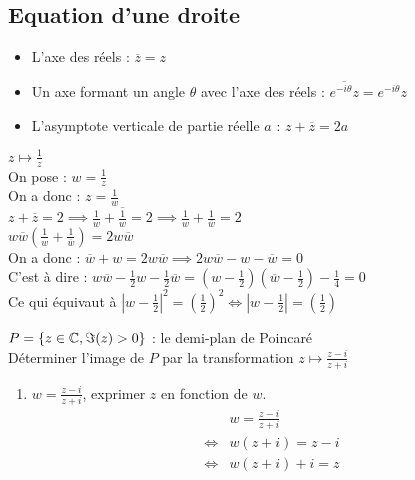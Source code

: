 \subsection{Equation d'une droite}
\begin{itemize}
    \item L'axe des réels : $\overline{z} = z$
    \item Un axe formant un angle $\theta$ avec l'axe des réels : $\overline{e^{-i\theta}z}= e^{-i\theta}z$
    \item L'asymptote verticale de partie réelle $a$ : $z + \overline{z} = 2a$
\end{itemize}

\begin{exemple}
    $z \mapsto \frac{1}{z}$ 
    \\
    On pose : $w = \frac{1}{z}$
    \\
    On a donc : $z = \frac{1}{w}$
    \\
    $z + \overline{z} = 2 \implies \frac{1}{w} + \overline{\frac{1}{w}} = 2 \implies \frac{1}{w} + \frac{1}{\overline{w}} = 2$ \\
    $w\overline{w} \left( \frac{1}{w} + \frac{1}{\overline{w}} \right) = 2w\overline{w}$
    \\
    On a donc : $\overline{w} + w = 2w\overline{w} \implies 2w\overline{w} - w - \overline{w} = 0$ 
    \\
    C'est à dire : $w\overline{w} - \frac{1}{2}w - \frac{1}{2}\overline{w} = \left( w - \frac{1}{2} \right) \left( \overline{w} - \frac{1}{2} \right) - \frac{1}{4} = 0$
    \\
    Ce qui équivaut à $\left| w - \frac{1}{2} \right|^2 = \left( \frac{1}{2} \right)^2 \iff \left|w - \frac{1}{2}\right| = \left(\frac{1}{2}\right)$
\end{exemple}

\begin{exemple}
    $P = \left\{ z \in \mathbb{C}, \Im{(z)} > 0\right\}$ : le demi-plan de Poincaré    
    \\
    Déterminer l'image de $P$ par la transformation $z \mapsto \frac{z - i}{z + i}$
    \\
    \begin{enumerate}
        \item $w = \frac{z - i}{z + i}$, exprimer $z$ en fonction de $w$.
            \begin{align*}
                &w = \frac{z - i}{z + i} \\
                \iff &w(z + i) = z - i \\
                \iff &w(z + i) + i = z
            \end{align*}
    \end{enumerate}
\end{exemple}
